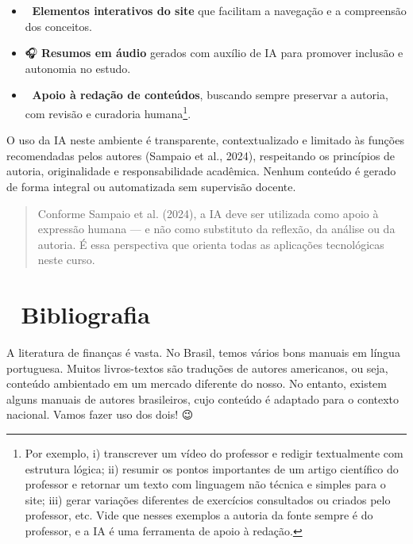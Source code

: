 \documentclass[
  a4paper,
]{book}
\providecommand{\tightlist}{%
  \setlength{\itemsep}{0pt}\setlength{\parskip}{0pt}}\usepackage{longtable,booktabs,array}
\begin{document}
\begin{itemize}
\tightlist
\item
  🧭 \textbf{Elementos interativos do site} que facilitam a navegação e
  a compreensão dos conceitos.\\
\item
  🎧 \textbf{Resumos em áudio} gerados com auxílio de IA para promover
  inclusão e autonomia no estudo.\\
\item
  📄 \textbf{Apoio à redação de conteúdos}, buscando sempre preservar a
  autoria, com revisão e curadoria humana\footnote{Por exemplo, i)
    transcrever um vídeo do professor e redigir textualmente com
    estrutura lógica; ii) resumir os pontos importantes de um artigo
    científico do professor e retornar um texto com linguagem não
    técnica e simples para o site; iii) gerar variações diferentes de
    exercícios consultados ou criados pelo professor, etc. Vide que
    nesses exemplos a autoria da fonte sempre é do professor, e a IA é
    uma ferramenta de apoio à redação.}.
\end{itemize}

O uso da IA neste ambiente é transparente, contextualizado e limitado às
funções recomendadas pelos autores (Sampaio et al., 2024), respeitando
os princípios de autoria, originalidade e responsabilidade acadêmica.
Nenhum conteúdo é gerado de forma integral ou automatizada sem
supervisão docente.

\begin{quote}
Conforme Sampaio et al. (2024), a IA deve ser utilizada como apoio à
expressão humana --- e não como substituto da reflexão, da análise ou da
autoria. É essa perspectiva que orienta todas as aplicações tecnológicas
neste curso.
\end{quote}

\section*{📖 Bibliografia}\label{sec-biblio}


A literatura de finanças é vasta. No Brasil, temos vários bons manuais
em língua portuguesa. Muitos livros-textos são traduções de autores
americanos, ou seja, conteúdo ambientado em um mercado diferente do
nosso. No entanto, existem alguns manuais de autores brasileiros, cujo
conteúdo é adaptado para o contexto nacional. Vamos fazer uso dos dois!
😉
\end{document}
